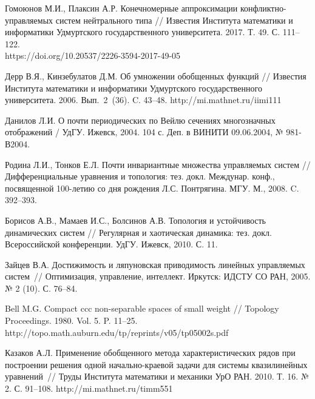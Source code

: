 \documentclass[12pt,a4paper,twoside]{article}  %
\begin{document}
{\begin{thebibliography}{99}

Гомоюнов М.И., Плаксин А.Р. Конечномерные аппроксимации конфликтно-управляемых систем нейтрального типа // Известия Института математики и информатики Удмуртского государственного университета. 2017. Т. 49. С. 111--122. \\
https://doi.org/10.20537/2226-3594-2017-49-05


Дерр В.Я., Кинзебулатов Д.М. Об умножении обобщенных функций // Известия Института математики и информатики Удмуртского государственного университета. 2006. Вып.~2~(36). C. 43--48.
http://mi.mathnet.ru/iimi111


Данилов Л.И. О почти периодических по Вейлю сечениях многозначных отображений / УдГУ. Ижевск, 2004. 104 с. Деп. в ВИНИТИ 09.06.2004, № 981-В2004.


 Родина Л.И., Тонков Е.Л. Почти инвариантные множества управляемых систем // Дифференциальные уравнения и топология: тез. докл. Междунар. конф., посвященной 100-летию со дня рождения Л.С. Понтрягина. МГУ. М., 2008. C. 392--393.

 Борисов А.В., Мамаев И.С., Болсинов А.В. Топология и устойчивость динамических систем // Регулярная и хаотическая динамика: тез. докл. Всероссийской конференции. УдГУ. Ижевск, 2010. С. 11.


 Зайцев В.А. Достижимость и ляпуновская приводимость линейных управляемых систем~// Оптимизация, управление, интеллект. Иркутск: ИДСТУ СО РАН, 2005. № 2 (10). С. 76--84.


 Bell M.G. Compact ccc non-separable spaces of small weight // Topology Proceedings. 1980. Vol. 5. P. 11--25.
http://topo.math.auburn.edu/tp/reprints/v05/tp05002s.pdf


 Казаков А.Л.
Применение обобщенного метода характеристических рядов при построении решения одной начально-краевой задачи для системы квазилинейных уравнений~// Труды Института математики и механики УрО РАН.
2010. Т. 16. № 2. С. 91--108.
http://mi.mathnet.ru/timm551


\end{thebibliography}}
\end{document}
